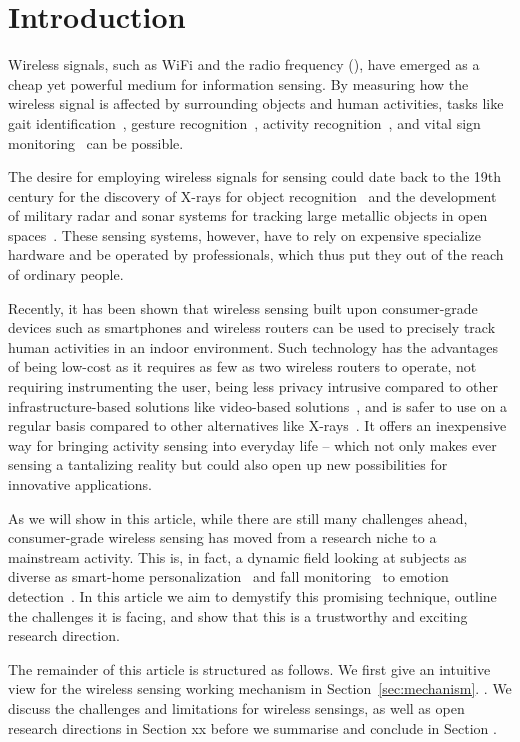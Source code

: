 \section{Introduction}
Wireless signals, such as WiFi and the radio frequency (\RF), have emerged as a cheap yet powerful medium for information sensing. By
measuring how the wireless signal is affected by surrounding objects and human activities, tasks like gait identification~\cite{}, gesture
recognition~\cite{}, activity recognition~\cite{}, and vital sign monitoring~\cite{} can be possible.


The desire for employing wireless signals for sensing could date back to the 19th century  for the discovery of X-rays for object
recognition~\cite{} and the development of military radar and sonar systems for tracking large metallic objects in open
spaces~\cite{Charles Samuel Franklin 's development of first practcial radar}. These sensing systems, however, have to rely on expensive
specialize hardware and be operated by professionals, which thus put they out of the reach of ordinary people.



Recently, it has been shown that wireless sensing built upon consumer-grade devices such as smartphones and wireless routers can be used to
precisely track human activities in an indoor environment. Such technology has the advantages of being low-cost as it requires as few as
two wireless routers to operate, not requiring instrumenting the user, being less privacy intrusive compared to other infrastructure-based
solutions like video-based solutions~\cite{}, and is safer to use on a regular basis compared to other alternatives like X-rays~\cite{}. It
offers an inexpensive way for bringing activity sensing into everyday life -- which not only makes ever sensing a tantalizing reality but
could also open up new possibilities for innovative applications.


As we will show in this article, while there are still many challenges ahead, consumer-grade wireless sensing has moved from a research
niche to a mainstream activity. This is, in fact, a dynamic field looking at subjects as diverse as smart-home personalization~\cite{} and
fall monitoring~\cite{} to emotion detection~\cite{}. In this article we aim to demystify this promising technique, outline the challenges
it is facing, and show that this is a trustworthy and exciting research direction.




The remainder of this article is structured as follows. We first give an intuitive view for the wireless sensing working mechanism  in
Section~\ref{sec:mechanism}. . We discuss the challenges and limitations for wireless sensings, as
well as open research directions in Section xx before we summarise and conclude in Section .



